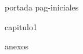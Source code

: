 \documentclass[a4paper,12pt,oneside]{book}
\begin{document}
{portada}
{pag-iniciales}
	
{capitulo1}

\printbibliography

\clearpage
{anexos}
\end{document}
